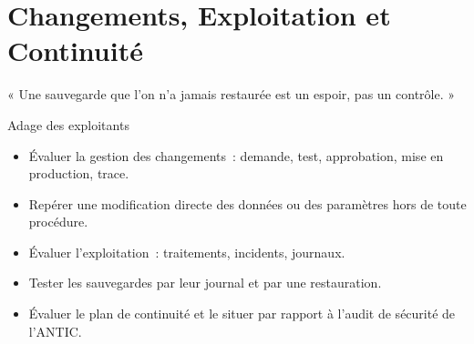 
\chapter{Changements, Exploitation et Continuité}
\label{chap:exploitation}

\epigraph{%
    « Une sauvegarde que l'on n'a jamais restaurée est un espoir, pas un
    contrôle. »%
}{Adage des exploitants}


\begin{boxobjectifs}
\begin{itemize}
    \item Évaluer la gestion des changements~: demande, test, approbation,
          mise en production, trace.
    \item Repérer une modification directe des données ou des paramètres
          hors de toute procédure.
    \item Évaluer l'exploitation~: traitements, incidents, journaux.
    \item Tester les sauvegardes par leur journal et par une restauration.
    \item Évaluer le plan de continuité et le situer par rapport à l'audit
          de sécurité de l'ANTIC.
\end{itemize}
\end{boxobjectifs}

